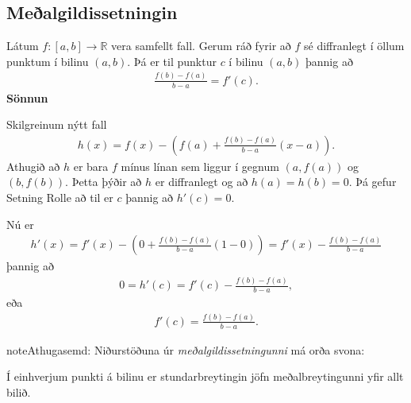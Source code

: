 \documentclass[a4paper,10pt,icelandic]{sphinxmanual}
\begin{document}

\subsection{Meðalgildissetningin}
\label{kafli03:id13}\label{kafli03:index-7}
Látum \(f:[a,b]\rightarrow{{\mathbb  R}}\) vera samfellt fall. Gerum
ráð fyrir að \(f\) sé diffranlegt í öllum punktum í bilinu
\((a,b)\). Þá er til punktur \(c\) í bilinu \((a,b)\) þannig
að
\begin{equation*}
\begin{split}\frac{f(b)-f(a)}{b-a}=f'(c).\end{split}
\end{equation*}
\textbf{Sönnun}

Skilgreinum nýtt fall
\begin{equation*}
\begin{split}h(x)=f(x)-\left(f(a)+ \frac{f(b)-f(a)}{b-a}(x-a)\right).\end{split}
\end{equation*}
Athugið að \(h\) er bara \(f\) mínus línan sem liggur í gegnum
\((a,f(a))\) og \((b,f(b))\). Þetta þýðir að \(h\) er diffranlegt
og að \(h(a)=h(b)=0\). Þá gefur Setning Rolle að til er \(c\) þannig að
\(h'(c)=0\).

Nú er
\begin{equation*}
\begin{split}h'(x) = f'(x) - \left(0+\frac{f(b)-f(a)}{b-a}(1-0)\right)
= f'(x) - \frac{f(b)-f(a)}{b-a}\end{split}
\end{equation*}
þannig að
\begin{equation*}
\begin{split}0 = h'(c) = f'(c) - \frac{f(b)-f(a)}{b-a},\end{split}
\end{equation*}
eða
\begin{equation*}
\begin{split}f'(c) = \frac{f(b)-f(a)}{b-a}.\end{split}
\end{equation*}
\begin{notice}{note}{Athugasemd:}
Niðurstöðuna úr \textit{meðalgildissetningunni} má orða svona:

Í einhverjum punkti á bilinu er stundarbreytingin jöfn meðalbreytingunni
yfir allt bilið.
\end{notice}

\end{document}
